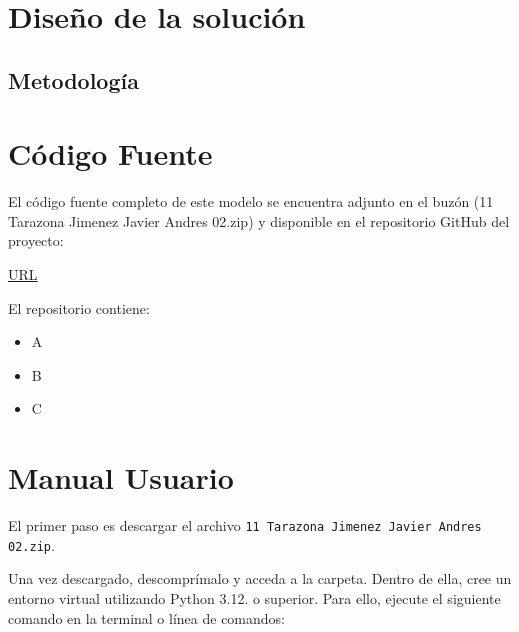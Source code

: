 \documentclass{article}
\begin{document}
\section{Diseño de la solución}\label{sec:dis}


\subsection{Metodología}




\section{Código Fuente}\label{sec:cod}

El código fuente completo de este modelo se encuentra adjunto en el buzón 
(11 Tarazona Jimenez Javier Andres 02.zip)
y disponible en el repositorio GitHub del proyecto:

\begin{center}
\url{URL}
\end{center}

El repositorio contiene:
\begin{itemize}
\item A
\item B
\item C
\end{itemize}


\section{Manual Usuario}\label{sec:man_u}

El primer paso es descargar el archivo \texttt{11 Tarazona Jimenez Javier Andres 02.zip}.

Una vez descargado, descomprímalo y acceda a la carpeta. Dentro de ella, cree un 
entorno virtual utilizando Python 3.12. o superior. Para ello, ejecute el siguiente 
comando en 
la terminal o línea de comandos:
\end{document}
